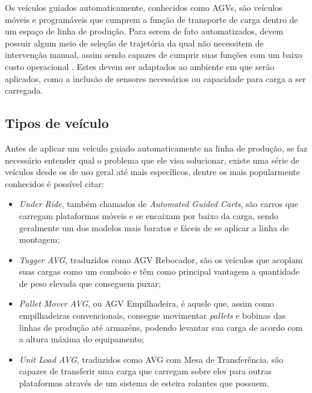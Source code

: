 Os veículos guiados automaticamente, conhecidos como AGVs, são veículos móveis
e programáveis que cumprem a função de transporte de carga dentro de um espaço
de linha de produção. Para serem de fato automatizados, devem possuir algum
meio de seleção de trajetória da qual não necessitem de intervenção manual,
assim sendo capazes de cumprir suas funções com um baixo custo operacional
\cite{kumar2016}. Estes devem ser adaptados ao ambiente em que serão
aplicados, como a inclusão de sensores necessários ou capacidade para carga a
ser carregada.

\subsection{Tipos de veículo}

Antes de aplicar um veículo guiado automaticamente na linha de produção, se faz
necessário entender qual o problema que ele visa solucionar, existe uma série
de veículos desde os de uso geral até mais específicos, dentre os mais
popularmente conhecidos é possível citar:

\begin{itemize}
        \item \textit{Under Ride}, também chamados de \textit{Automated Guided Carts}, são carros
                que carregam plataformas móveis e se encaixam por baixo da
                carga, sendo geralmente um dos modelos mais baratos e fáceis de
                se aplicar a linha de montagem;

        \item \textit{Tugger AVG}, traduzidos como AGV Rebocador, são os veículos que
                acoplam suas cargas como um comboio e têm como principal
                vantagem a quantidade de peso elevada que conseguem puxar;

        \item \textit{Pallet Mover AVG}, ou AGV Empilhadeira, é aquele que, assim como
                empilhadeiras convencionais, consegue movimentar \textit{pallets} e
                bobinas das linhas de produção até armazéns, podendo levantar
                sua carga de acordo com a altura máxima do equipamento;

        \item \textit{Unit Load AVG}, traduzidos como AVG com Mesa de Transferência, são
                capazes de transferir uma carga que carregam sobre eles para
                outras plataformas através de um sistema de esteira rolantes
                que possuem.

\end{itemize}

